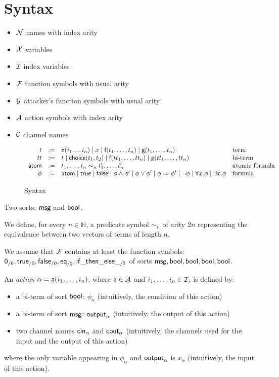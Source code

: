 \section{Syntax}

\begin{itemize}
  \item $\mathcal{N}$ names with index arity
  \item $\mathcal{X}$ variables
  \item $\mathcal{I}$ index variables
  \item $\mathcal{F}$ function symbols with usual arity
  \item $\mathcal{G}$ attacker's function symbols with usual arity
  \item $\mathcal{A}$ action symbols with index arity
  \item $\mathcal{C}$ channel names
\end{itemize}

\begin{figure}[h]
  \[
    \begin{array}{rcll}
      t & := & \textsf{n}(i_1 \dots i_n) \mid x \mid \textsf{f}(t_1,\dots,t_n) \mid \textsf{g}(t_1,\dots,t_n) & \text{term}
      \\
      tt & := & t \mid \mathsf{choice}(t_1,t_2) \mid \textsf{f}(tt_1,\dots,tt_n) \mid \textsf{g}(tt_1,\dots,tt_n) & \text{bi-term}
      \\
      \textsf{atom} & := & t_1,\dots,t_n \sim_n t'_1,\dots,t'_n & \text{atomic formula}
      \\
      \phi & := & \textsf{atom} \mid \textsf{true} \mid \textsf{false} \mid \phi \wedge \phi' \mid \phi \vee \phi' \mid \phi \Rightarrow \phi'\mid \neg \phi \mid \forall x.\phi \mid \exists x.\phi & \text{formula}
    \end{array}
  \]
  \caption{Syntax}
  \label{fig:syntax}
\end{figure}

Two sorts: $\textsf{msg}$ and $\textsf{bool}$.

We define, for every $n \in \mathbb{N}$, a predicate symbol $\sim_n$ of arity $2n$ representing the equivalence between two vectors of terms of length $n$.

We assume that $\mathcal{F}$ contains at least the function symbols: $\mathsf{0}_{/0}, \textsf{true}_{/0}, \textsf{false}_{/0}, \mathsf{eq}_{/2}, \mathsf{if\_then\_else\_}_{/3}$ of sorts $\textsf{msg}, \textsf{bool}, \textsf{bool}, \textsf{bool}, \textsf{bool}$.

\begin{definition}
An \emph{action} $\alpha = \textsf{a}(i_1,\dots,i_n)$, where $\textsf{a} \in \mathcal{A}$ and $i_1,\dots,i_n \in \mathcal{I}$, is defined by:
\begin{itemize}
  \item a bi-term of sort $\textsf{bool}$: $\phi_{\alpha}$ (intuitively, the condition of this action)
  \item a bi-term of sort $\textsf{msg}$: $\textsf{output}_{\alpha}$ (intuitively, the output of this action)
  \item two channel names $\mathsf{cin}_\alpha$ and $\mathsf{cout}_\alpha$ (intuitively, the channels used for the input and the output of this action)
\end{itemize}
where the only variable appearing in $\phi_{\alpha}$ and $\textsf{output}_{\alpha}$ is $x_{\alpha}$ (intuitively, the input of this action).
\end{definition}

